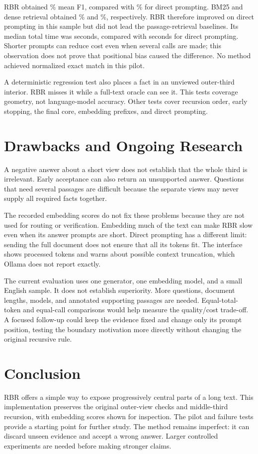 \documentclass[conference]{IEEEtran}
\begin{document}
RBR obtained \RbrFone\% mean F1, compared with \DirectFone\% for direct prompting. BM25 and dense retrieval obtained \BmFone\% and \DenseFone\%, respectively. RBR therefore improved on direct prompting in this sample but did not lead the passage-retrieval baselines. Its median total time was \RbrTime{} seconds, compared with \DirectTime{} seconds for direct prompting. Shorter prompts can reduce cost even when several calls are made; this observation does not prove that positional bias caused the difference. No method achieved normalized exact match in this pilot.

A deterministic regression test also places a fact in an unviewed outer-third interior. RBR misses it while a full-text oracle can see it. This tests coverage geometry, not language-model accuracy. Other tests cover recursion order, early stopping, the final core, embedding prefixes, and direct prompting.

\section{Drawbacks and Ongoing Research}
A negative answer about a short view does not establish that the whole third is irrelevant. Early acceptance can also return an unsupported answer. Questions that need several passages are difficult because the separate views may never supply all required facts together.

The recorded embedding scores do not fix these problems because they are not used for routing or verification. Embedding much of the text can make RBR slow even when its answer prompts are short. Direct prompting has a different limit: sending the full document does not ensure that all its tokens fit. The interface shows processed tokens and warns about possible context truncation, which Ollama does not report exactly.

The current evaluation uses one generator, one embedding model, and a small English sample. It does not establish superiority. More questions, document lengths, models, and annotated supporting passages are needed. Equal-total-token and equal-call comparisons would help measure the quality/cost trade-off. A focused follow-up could keep the evidence fixed and change only its prompt position, testing the boundary motivation more directly without changing the original recursive rule.

\section{Conclusion}
RBR offers a simple way to expose progressively central parts of a long text. This implementation preserves the original outer-view checks and middle-third recursion, with embedding scores shown for inspection. The pilot and failure tests provide a starting point for further study. The method remains imperfect: it can discard unseen evidence and accept a wrong answer. Larger controlled experiments are needed before making stronger claims.
\end{document}

